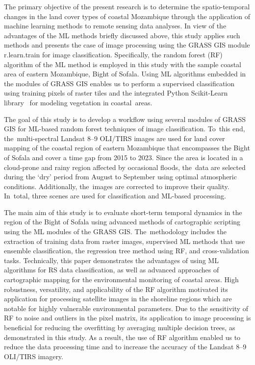 \documentclass[coasts,article,accept,pdftex,oneauthor]{Definitions/mdpi}
\begin{document}
{The primary objective of the present research is to determine the spatio-temporal changes in the land cover types of coastal Mozambique through the application of machine learning methods to remote sensing data analyses. }In view of the advantages of the ML methods briefly discussed above, {this study applies} such methods {and presents} the case of image processing using the GRASS GIS module  r.learn.train for image classification. Specifically,{ }the random forest (RF) algorithm of the ML method{ is employed in this study }with the sample coastal area of eastern Mozambique, Bight of Sofala. Using ML algorithms embedded in the modules of GRASS GIS enables us to perform a supervised classification using training pixels of raster tiles and the integrated Python Scikit-Learn library~\cite{Pedregosa} for modeling vegetation in coastal~areas. 

{The goal of this study is to develop a workflow using several modules of GRASS GIS for ML-based random forest techniques of image classification. To~this end, the~multi-spectral Landsat {8--9} %
 OLI/TIRS images are used for land cover mapping of the coastal region of eastern Mozambique that encompasses the Bight of Sofala and cover a time gap from 2015 to 2023. Since the area is located in a cloud-prone and rainy region affected by occasional floods, the~data are selected during the `dry' period from August to September using optimal atmospheric conditions. Additionally, the~images are corrected to improve {their} quality. In~total, three scenes are used for classification and ML-based processing.}

{The main aim of this study is to evaluate short-term temporal dynamics in the region of the Bight of Sofala using advanced methods of cartographic scripting using the ML modules of {the} GRASS GIS. The~methodology includes the extraction of training data from{ }raster images, supervised ML methods that use ensemble classification{, }the regression tree method using RF, and cross-validation tasks. Technically, this paper demonstrates the advantages of using ML algorithms for RS data classification{, as well as advanced approaches of} cartographic mapping for {the }environmental monitoring of coastal areas. High robustness, versatility, and applicability of the RF algorithm motivated its application for processing satellite images in the shoreline regions {which are notable for highly vulnerable} environmental parameters{. }Due to the sensitivity of RF to noise and outliers in the pixel matrix, its application to image processing is beneficial for reducing {the} overfitting by averaging multiple decision trees{, as demonstrated} in this study. {As a result, the use of RF algorithm enabled us to reduce} the data processing time and {to increase the} accuracy of {the }Landsat {8--9} OLI/TIRS imagery. }
\end{document}
